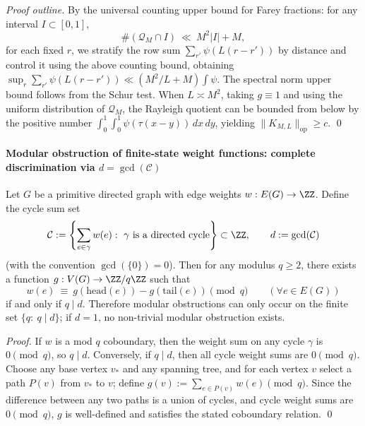 \begin{proof}[Proof outline]
By the universal counting upper bound for Farey fractions: for any interval \(I\subset[0,1]\),
\[
\#(\mathcal{Q}_M\cap I)\ \ll\ M^2|I|+M,
\]
for each fixed \(r\), we stratify the row sum \(\sum_{r'}\psi(L(r-r'))\) by distance and control it using the above counting bound, obtaining
\(
\sup_r\sum_{r'}\psi(L(r-r'))\ll (M^2/L+M)\int\psi
\).
The spectral norm upper bound follows from the Schur test.
When \(L\asymp M^2\), taking \(g\equiv 1\) and using the uniform distribution of \(\mathcal{Q}_M\), the Rayleigh quotient can be bounded from below by the positive number \(\int_0^1\int_0^1\psi(\tau(x-y))\,dx\,dy\), yielding \(\|K_{M,L}\|_{\mathrm{op}}\ge c\). \qed
\end{proof}

\paragraph{Modular obstruction of finite-state weight functions: complete discrimination via \texorpdfstring{$d=\gcd(\mathcal{C})$}{d=gcd(C)}}
\begin{proposition}\label{prop:gm-cycle-gcd-mod-obstruction}
Let \(G\) be a primitive directed graph with edge weights \(w:E(G)\to\ZZ\).
Define the cycle sum set
\[
\mathcal{C}:=\left\{\sum_{e\in\gamma}w(e):\ \gamma\ \text{is a directed cycle}\right\}\subset\ZZ,
\qquad
d:=\gcd(\mathcal{C})
\]
(with the convention \(\gcd(\{0\})=0\)).
Then for any modulus \(q\ge 2\), there exists a function \(g:V(G)\to\ZZ/q\ZZ\) such that
\[
w(e)\ \equiv\ g(\mathrm{head}(e))-g(\mathrm{tail}(e))\pmod q
\qquad(\forall e\in E(G))
\]
if and only if \(q\mid d\).
Therefore modular obstructions can only occur on the finite set \(\{q:\ q\mid d\}\); if \(d=1\), no non-trivial modular obstruction exists.
\end{proposition}

\begin{proof}
If \(w\) is a mod \(q\) coboundary, then the weight sum on any cycle \(\gamma\) is \(0\pmod q\), so \(q\mid d\).
Conversely, if \(q\mid d\), then all cycle weight sums are \(0\pmod q\).
Choose any base vertex \(v_\ast\) and any spanning tree, and for each vertex \(v\) select a path \(P(v)\) from \(v_\ast\) to \(v\); define
\(
g(v):=\sum_{e\in P(v)} w(e)\pmod q
\).
Since the difference between any two paths is a union of cycles, and cycle weight sums are \(0\pmod q\), \(g\) is well-defined and satisfies the stated coboundary relation. \qed
\end{proof}

